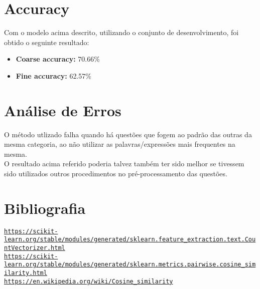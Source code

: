 \documentclass{article}
\begin{document}
\section{Accuracy}
Com o modelo acima descrito, utilizando o conjunto de desenvolvimento, foi obtido o seguinte resultado:
\begin{itemize}
    \item \textbf{Coarse accuracy:} 70.66\%
    \item \textbf{Fine accuracy:} 62.57\%
\end{itemize}

\section{Análise de Erros}
O método utlizado falha quando há questões que fogem ao padrão das outras da mesma categoria, ao não utilizar as palavras/expressões mais frequentes na mesma.\\
O resultado acima referido poderia talvez também ter sido melhor se tivessem sido utilizados outros procedimentos no pré-processamento das questões.

\section{Bibliografia}
\href{https://scikit-learn.org/stable/modules/generated/sklearn.feature_extraction.text.CountVectorizer.html}{\texttt{https://scikit-learn.org/stable/modules/generated/sklearn.feature\_extraction.text.CountVectorizer.html}}\\
\href{https://scikit-learn.org/stable/modules/generated/sklearn.metrics.pairwise.cosine_similarity.html}{\texttt{https://scikit-learn.org/stable/modules/generated/sklearn.metrics.pairwise.cosine\_similarity.html}}\\
\href{https://en.wikipedia.org/wiki/Cosine_similarity}{\texttt{https://en.wikipedia.org/wiki/Cosine\_similarity}}
\end{document}
